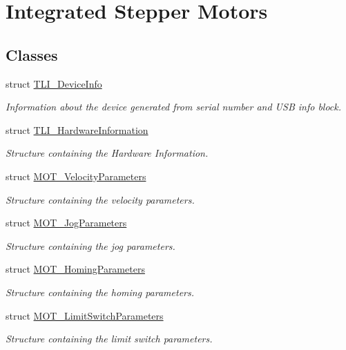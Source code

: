 \hypertarget{group___integrated_stepper_motors}{}\section{Integrated Stepper Motors}
\label{group___integrated_stepper_motors}
\subsection*{Classes}
\begin{DoxyCompactItemize}
\item 
struct \hyperlink{struct_t_l_i___device_info}{T\+L\+I\+\_\+\+Device\+Info}
\begin{DoxyCompactList}\small\item\em Information about the device generated from serial number and U\+SB info block. \end{DoxyCompactList}\item 
struct \hyperlink{struct_t_l_i___hardware_information}{T\+L\+I\+\_\+\+Hardware\+Information}
\begin{DoxyCompactList}\small\item\em Structure containing the Hardware Information. \end{DoxyCompactList}\item 
struct \hyperlink{struct_m_o_t___velocity_parameters}{M\+O\+T\+\_\+\+Velocity\+Parameters}
\begin{DoxyCompactList}\small\item\em Structure containing the velocity parameters. \end{DoxyCompactList}\item 
struct \hyperlink{struct_m_o_t___jog_parameters}{M\+O\+T\+\_\+\+Jog\+Parameters}
\begin{DoxyCompactList}\small\item\em Structure containing the jog parameters. \end{DoxyCompactList}\item 
struct \hyperlink{struct_m_o_t___homing_parameters}{M\+O\+T\+\_\+\+Homing\+Parameters}
\begin{DoxyCompactList}\small\item\em Structure containing the homing parameters. \end{DoxyCompactList}\item 
struct \hyperlink{struct_m_o_t___limit_switch_parameters}{M\+O\+T\+\_\+\+Limit\+Switch\+Parameters}
\begin{DoxyCompactList}\small\item\em Structure containing the limit switch parameters. \end{DoxyCompactList}\item 

\end{DoxyCompactItemize}
